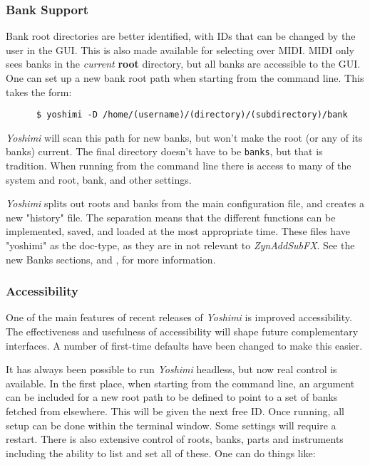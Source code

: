 \documentclass[
 11pt,
 twoside,
 a4paper,
 final                                 %
]{article}
\begin{document}
\subsubsection{Bank Support}
\label{subsubsec:new_features_bank_support}

   Bank root directories are better identified, with IDs that can be changed by
   the user in the GUI. This is also made available for selecting over MIDI.
   MIDI only sees banks in the \textsl{current}
   \textbf{root} directory, but all banks are accessible to the GUI.
   One can set up a new bank root path when starting from the
   command line. This takes the form:

   \begin{verbatim}
      $ yoshimi -D /home/(username)/(directory)/(subdirectory)/bank
   \end{verbatim}

   \textsl{Yoshimi} will scan this path for new banks, but
   won't make the root (or any of its banks) current. The final directory
   doesn't have to be \texttt{banks}, but that is tradition.
   When running from the command line there is access to many
   of the system and root, bank, and other settings.

	\textsl{Yoshimi} splits out roots and banks from the main configuration
	file, and creates a new "history" file. The separation means that the
	different functions can be implemented, saved, and loaded at the most
   appropriate time. These files have "yoshimi" as the doc-type, as they are in
   not relevant to \textsl{ZynAddSubFX}.
   See the new Banks sections,
   and
   ,
   for more information.

\subsubsection{Accessibility}
\label{subsubsec:new_features_accessibility}

   One of the main features of recent releases of \textsl{Yoshimi} is improved
   accessibility. The effectiveness and usefulness of accessibility will
   shape future complementary interfaces. A number of first-time defaults
   have been changed to make this easier.

   It has always been possible to run \textsl{Yoshimi} headless, but now real
   control is available. In the first place, when starting from the command
   line, an argument can be included for a new root path to be defined to point
   to a set of banks fetched from elsewhere. This will be given the next free
   ID.
   Once running, all setup can be done within the terminal window.
   Some settings will require a restart.
   There is also extensive control of
   roots, banks, parts and instruments including the ability to list and set
   all of these. One can do things like:
\end{document}
